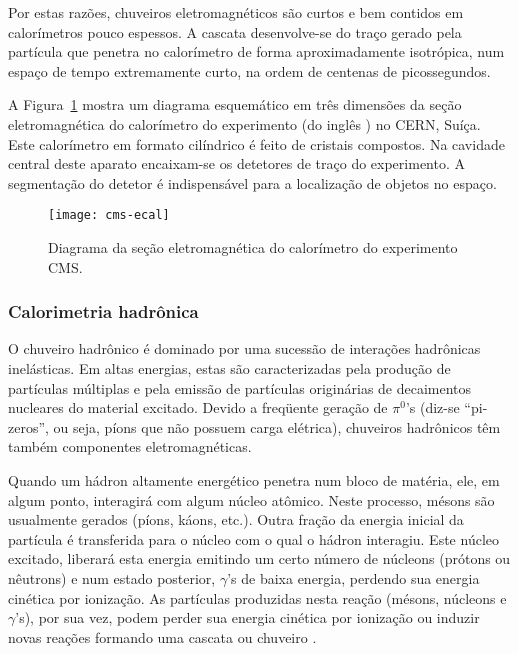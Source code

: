 Por estas razões, chuveiros eletromagnéticos são curtos e bem contidos em
calorímetros pouco espessos. A cascata desenvolve-se do traço gerado pela
par\-tí\-cu\-la que penetra no calorímetro de forma aproximadamente
isotrópica, num espaço de tempo extremamente curto, na ordem de centenas de
picossegundos.

A Figura~\ref{fig:cms-ecal} mostra um diagrama esquemático em três dimensões
da seção eletromagnética do calorímetro do experimento  (do inglês
) no CERN, Suíça. Este calorímetro em formato
cilíndrico é feito de cristais compostos. Na cavidade central deste aparato
encaixam-se os detetores de traço do experimento. A segmentação do detetor é
indispensável para a localização de objetos no espaço.

\begin{figure}
\begin{center}
\texttt{[image: cms-ecal]}
\end{center}
\caption{Diagrama da seção eletromagnética do calorímetro do experimento CMS.}
\label{fig:cms-ecal}
\end{figure}

\subsubsection{Calorimetria hadrônica}
\label{sec:calohad}

O chuveiro hadrônico é dominado por uma sucessão de interações hadrônicas
inelásticas. Em altas energias, estas são caracterizadas pela produção de
partículas múltiplas e pela emissão de partículas originárias de decaimentos
nucleares do material excitado. Devido a freqüente geração de $\pi^{0}$'s
(diz-se ``pi-zeros'', ou seja, píons que não possuem carga elétrica),
chuveiros hadrônicos têm também componentes eletromagnéticas.

Quando um hádron altamente ener\-gé\-tico penetra num bloco de ma\-té\-ria,
ele, em algum ponto, interagi\-rá com algum nú\-cleo atômico. Neste processo,
mésons são usualmente gerados (píons, káons, etc.). Outra fração da energia
inicial da partícula é transferida para o núcleo com o qual o hádron
interagiu. Este núcleo excitado, liberará esta energia emitindo um certo
nú\-mero de nú\-cleons (prótons ou nêutrons) e num estado posterior,
$\gamma$'s de baixa energia, perdendo sua energia cinética por ionização. As
partículas produzidas nesta reação (mésons, núcleons e $\gamma$'s), por sua
vez, podem perder sua energia cinética por ionização ou induzir novas reações
formando uma cascata ou chuveiro \cite{hadcal}.

